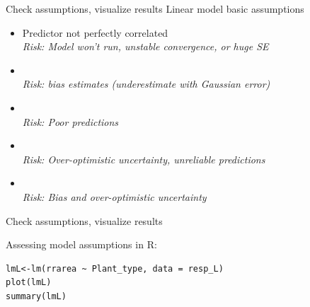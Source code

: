 \documentclass[10pt]{beamer}
\makeatletter
\newenvironment{kframe}{%
 \def\at@end@of@kframe{}%
 \ifinner\ifhmode%
  \def\at@end@of@kframe{\end{minipage}}%
  \begin{minipage}{\columnwidth}%
 \fi\fi%
 \def\FrameCommand##1{\hskip\@totalleftmargin \hskip-\fboxsep
 \colorbox{shadecolor}{##1}\hskip-\fboxsep
     \hskip-\linewidth \hskip-\@totalleftmargin \hskip\columnwidth}%
 \MakeFramed {\advance\hsize-\width
   \@totalleftmargin\z@ \linewidth\hsize
   \@setminipage}}%
 {\par\unskip\endMakeFramed%
 \at@end@of@kframe}
\newenvironment{knitrout}{}{} %
\makeatother
\begin{document}
\begin{frame}{Check assumptions, visualize results}
\pause 
Linear model basic assumptions
 \begin{block}{}
     \begin{itemize}[<+->]
       \item Predictor not perfectly correlated \\ \textit{Risk: Model won't run, unstable convergence, or huge SE}
       \item {\color{red!20!black}{Little error in predictors}}\\ \textit{Risk: bias estimates (underestimate with Gaussian error)}
       \item {\color{red!50!black}{Gaussian error distribution}}\\ \textit{Risk: Poor predictions}
       \item {\color{red!70!black}{Homoscedasticity (constant error variance)}}\\ \textit{Risk: Over-optimistic uncertainty, unreliable predictions}
       \item {\color{red!99!black}{Independence of error}}\\ \textit{Risk: Bias and over-optimistic uncertainty}
     \end{itemize}
 \end{block}
\end{frame}

\begin{frame}[fragile]{Check assumptions, visualize results}

Assessing model assumptions in R:

\begin{knitrout}
\color{fgcolor}\begin{kframe}
\begin{verbatim}
lmL<-lm(rrarea ~ Plant_type, data = resp_L)
plot(lmL)
summary(lmL)
\end{verbatim}
\end{kframe}
\end{knitrout}

\end{frame}
\end{document}
